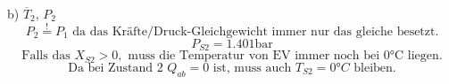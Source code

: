 b) $\overline{T}_2$, $P_2$
\[
P_2 \overset{!}{=} P_1 \text{ da das Kräfte/Druck-Gleichgewicht immer nur das gleiche besetzt.}
\]
\[
P_{S2} = 1.401 \text{bar}
\]
\[
\text{Falls das } X_{S2} > 0, \text{ muss die Temperatur von EV immer noch bei 0°C liegen.}
\]
\[
\text{Da bei Zustand 2 } Q_{ab} = 0 \text{ ist, muss auch } T_{S2} = 0°C \text{ bleiben.}
\]